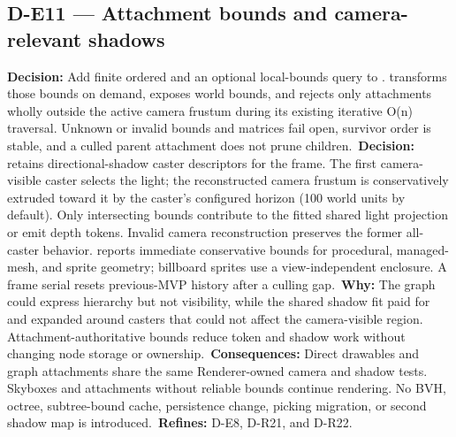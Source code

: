 \subsection*{D-E11 --- Attachment bounds and camera-relevant shadows}
\begin{decisionbox}[title={D-E11 \quad 2026-09-16}]
\textbf{Decision:} Add finite ordered  and an
optional local-bounds query to .
 transforms those bounds on demand, exposes world bounds,
and rejects only attachments wholly outside the active camera frustum during
its existing iterative O(n) traversal. Unknown or invalid bounds and matrices
fail open, survivor order is stable, and a culled parent attachment does not
prune children.\
\textbf{Decision:}  retains directional-shadow caster
descriptors for the frame. The first camera-visible caster selects the light;
the reconstructed camera frustum is conservatively extruded toward it by the
caster's configured horizon (100 world units by default). Only intersecting
bounds contribute to the fitted shared light projection or emit depth tokens.
Invalid camera reconstruction preserves the former all-caster behavior.
\symbolref{MeshVisual} reports immediate conservative bounds for procedural,
managed-mesh, and sprite geometry; billboard sprites use a view-independent
enclosure. A frame serial resets previous-MVP history after a culling gap.\
\textbf{Why:} The graph could express hierarchy but not visibility, while the
shared shadow fit paid for and expanded around casters that could not affect
the camera-visible region. Attachment-authoritative bounds reduce token and
shadow work without changing node storage or ownership.\
\textbf{Consequences:} Direct  drawables and graph
attachments share the same Renderer-owned camera and shadow tests. Skyboxes and
attachments without reliable bounds continue rendering. No BVH, octree,
subtree-bound cache, persistence change, picking migration, or second shadow
map is introduced.\
\textbf{Refines:} D-E8, D-R21, and D-R22.
\end{decisionbox}


